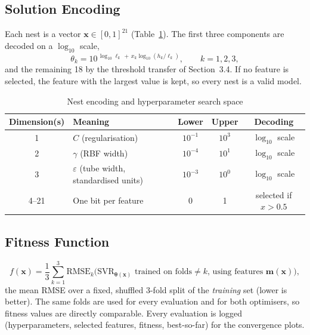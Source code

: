 \documentclass[12pt,a4paper]{article}
\numberwithin{equation}{section}
\numberwithin{table}{section}
\numberwithin{figure}{section}
\newcommand{\RMSE}{\mathrm{RMSE}}
\begin{document}
\subsection{Solution Encoding}
Each nest is a vector $\mathbf{x} \in [0,1]^{21}$ (Table~\ref{tab:encoding}). The first three components are decoded on a $\log_{10}$ scale,
\begin{equation}
  \theta_k = 10^{\,\log_{10} \ell_k \,+\, x_k \log_{10}(h_k / \ell_k)}, \qquad k = 1,2,3,
\end{equation}
and the remaining 18 by the threshold transfer of Section~3.4. If no feature is selected, the feature with the largest value is kept, so every nest is a valid model.

\begin{table}[H]
\centering
\caption{Nest encoding and hyperparameter search space}
\label{tab:encoding}
\small
\renewcommand{\arraystretch}{1.15}
\begin{tabular}{@{}clccc@{}}
\toprule
\textbf{Dimension(s)} & \textbf{Meaning} & \textbf{Lower} & \textbf{Upper} & \textbf{Decoding} \\ \midrule
1 & $C$ (regularisation) & $10^{-1}$ & $10^{3}$ & $\log_{10}$ scale \\
2 & $\gamma$ (RBF width) & $10^{-4}$ & $10^{1}$ & $\log_{10}$ scale \\
3 & $\varepsilon$ (tube width, standardised units) & $10^{-3}$ & $10^{0}$ & $\log_{10}$ scale \\
4--21 & One bit per feature & 0 & 1 & selected if $x > 0.5$ \\ \bottomrule
\end{tabular}
\end{table}

\subsection{Fitness Function}
\begin{equation}
  f(\mathbf{x}) = \frac{1}{3} \sum_{k=1}^{3} \RMSE_k\big(\mathrm{SVR}_{\boldsymbol{\theta}(\mathbf{x})} \text{ trained on folds} \neq k \text{, using features } \mathbf{m}(\mathbf{x})\big),
\end{equation}
the mean RMSE over a fixed, shuffled 3-fold split of the \emph{training} set (lower is better). The same folds are used for every evaluation and for both optimisers, so fitness values are directly comparable. Every evaluation is logged (hyperparameters, selected features, fitness, best-so-far) for the convergence plots.
\end{document}
